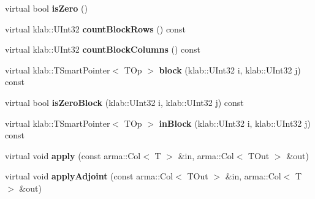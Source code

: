 \begin{DoxyCompactItemize}
\item 
virtual bool {\bfseries is\+Zero} ()\hypertarget{classkl1p_1_1TRowJointOperator_af6bb3e0261d607f3411f6af759ac466e}{}\label{classkl1p_1_1TRowJointOperator_af6bb3e0261d607f3411f6af759ac466e}

\item 
virtual klab\+::\+U\+Int32 {\bfseries count\+Block\+Rows} () const \hypertarget{classkl1p_1_1TRowJointOperator_a40eb25b27d418cae01df31cc134883e6}{}\label{classkl1p_1_1TRowJointOperator_a40eb25b27d418cae01df31cc134883e6}

\item 
virtual klab\+::\+U\+Int32 {\bfseries count\+Block\+Columns} () const \hypertarget{classkl1p_1_1TRowJointOperator_a00d5c9f32502b395538fe253853b2a44}{}\label{classkl1p_1_1TRowJointOperator_a00d5c9f32502b395538fe253853b2a44}

\item 
virtual klab\+::\+T\+Smart\+Pointer$<$ T\+Op $>$ {\bfseries block} (klab\+::\+U\+Int32 i, klab\+::\+U\+Int32 j) const \hypertarget{classkl1p_1_1TRowJointOperator_a7e5b83f791766a3c4f0f7de3a90876c5}{}\label{classkl1p_1_1TRowJointOperator_a7e5b83f791766a3c4f0f7de3a90876c5}

\item 
virtual bool {\bfseries is\+Zero\+Block} (klab\+::\+U\+Int32 i, klab\+::\+U\+Int32 j) const \hypertarget{classkl1p_1_1TRowJointOperator_afb180aaea0b1710ef2657a585f08fe66}{}\label{classkl1p_1_1TRowJointOperator_afb180aaea0b1710ef2657a585f08fe66}

\item 
virtual klab\+::\+T\+Smart\+Pointer$<$ T\+Op $>$ {\bfseries in\+Block} (klab\+::\+U\+Int32 i, klab\+::\+U\+Int32 j) const \hypertarget{classkl1p_1_1TRowJointOperator_a68930f344e792032617d7f9c3b13cb86}{}\label{classkl1p_1_1TRowJointOperator_a68930f344e792032617d7f9c3b13cb86}

\item 
virtual void {\bfseries apply} (const arma\+::\+Col$<$ T $>$ \&in, arma\+::\+Col$<$ T\+Out $>$ \&out)\hypertarget{classkl1p_1_1TRowJointOperator_a841a11e95aab9262fd637cd98831e827}{}\label{classkl1p_1_1TRowJointOperator_a841a11e95aab9262fd637cd98831e827}

\item 
virtual void {\bfseries apply\+Adjoint} (const arma\+::\+Col$<$ T\+Out $>$ \&in, arma\+::\+Col$<$ T $>$ \&out)\hypertarget{classkl1p_1_1TRowJointOperator_a44d564be0cbe79b6a3d22ccbb836e23e}{}\label{classkl1p_1_1TRowJointOperator_a44d564be0cbe79b6a3d22ccbb836e23e}


\end{DoxyCompactItemize}
